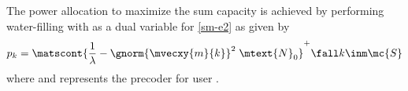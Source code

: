 The power allocation to maximize the sum capacity is achieved by performing water-filling with \me{\lambda} as a dual variable for \eqref{sm-e2} as given by
\begin{equation}
p_k = \matscont{\frac{1}{\lambda} - \gnorm{\mvecxy{m}{k}}^2 \; \mtext{N}_{0}}^+ \fall k \inm \mc{S}
\label{sm-e4}
\end{equation}
where  and 
represents the precoder for user .
